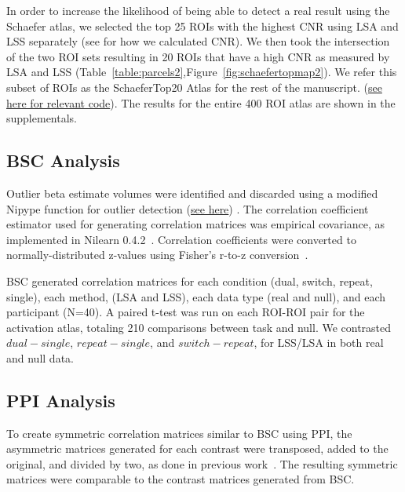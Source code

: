 \documentclass[phd,appendix,figures]{uithesis}
\begin{document}
In order to increase the likelihood of being able to detect a real result using the Schaefer atlas,
we selected the top 25 ROIs with the highest CNR using LSA and LSS separately
(see  for how we calculated CNR).
We then took the intersection of the two ROI sets resulting in 20 ROIs that have a high CNR
as measured by LSA and LSS (Table~\ref{table:parcels2},Figure~\ref{fig:schaefertopmap2}).
We refer this subset of ROIs as the SchaeferTop20 Atlas for the rest of the manuscript.
(\href{https://github.com/jdkent/BetaSeriesRealDataAnalysis/blob/b18b44321edf7b662a1e5ea635f64452c8d3644c/nibsAnalysis/cnr_trial_variability.ipynb}{see here for relevant code}).
The results for the entire 400 ROI atlas are shown in the supplementals.

\subsection*{BSC Analysis}

Outlier beta estimate volumes were identified and discarded using a
modified Nipype function for outlier detection
(\href{https://github.com/HBClab/NiBetaSeries/blob/a45c0a1f/src/nibetaseries/interfaces/nilearn.py#L153}{see here}) \cite{Crosby1994}.
The correlation coefficient estimator used for generating correlation matrices
was empirical covariance, as implemented in Nilearn 0.4.2~\cite{Abraham2014}.
Correlation coefficients were converted to normally-distributed z-values using
Fisher's r-to-z conversion~\cite{Fisher1915}.

BSC generated correlation matrices for each condition (dual, switch, repeat, single),
each method, (LSA and LSS), each data type (real and null), and each participant (N=40).
A paired t-test was run on each ROI-ROI pair for the activation atlas, totaling 210 comparisons
between task and null.
We contrasted $dual - single$, $repeat - single$, and $switch - repeat$, for LSS/LSA in both
real and null data.

\subsection*{PPI Analysis}

To create symmetric correlation matrices similar to BSC using PPI, the asymmetric matrices generated for
each contrast were transposed, added to the original, and divided by two, as done in previous work~\cite{Di2019a}.
The resulting symmetric matrices were comparable to the contrast matrices generated from BSC.
\end{document}
